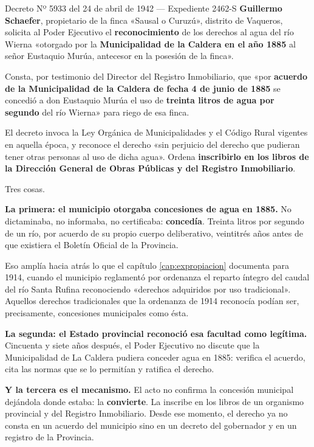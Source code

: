 \begin{ficha}{Decreto Nº 5933 del 24 de abril de 1942 --- Expediente 2462-S}
\textbf{Guillermo Schaefer}, propietario de la finca «Sausal o Curuzú», distrito de Vaqueros,
solicita al Poder Ejecutivo el \textbf{reconocimiento} de los derechos al agua del río
Wierna «otorgado por la \textbf{Municipalidad de la Caldera en el año 1885} al señor Eustaquio
Murúa, antecesor en la posesión de la finca».

Consta, por testimonio del Director del Registro Inmobiliario, que «por \textbf{acuerdo de la
Municipalidad de la Caldera de fecha 4 de junio de 1885} se concedió a don Eustaquio Murúa
el uso de \textbf{treinta litros de agua por segundo} del río Wierna» para riego de esa finca.

El decreto invoca la Ley Orgánica de Municipalidades y el Código Rural vigentes en aquella
época, y reconoce el derecho «sin perjuicio del derecho que pudieran tener otras personas al
uso de dicha agua». Ordena \textbf{inscribirlo en los libros de la Dirección General de Obras
Públicas y del Registro Inmobiliario}.
\end{ficha}

Tres cosas.

\textbf{La primera: el municipio otorgaba concesiones de agua en 1885.} No dictaminaba, no
informaba, no certificaba: \textbf{concedía}. Treinta litros por segundo de un río, por
acuerdo de su propio cuerpo deliberativo, veintitrés años antes de que existiera el Boletín
Oficial de la Provincia.

Eso amplía hacia atrás lo que el capítulo \ref{cap:expropiacion} documenta para 1914, cuando el municipio
reglamentó por ordenanza el reparto íntegro del caudal del río Santa Rufina reconociendo
«derechos adquiridos por uso tradicional». Aquellos derechos tradicionales que la ordenanza de
1914 reconocía podían ser, precisamente, concesiones municipales como ésta.

\textbf{La segunda: el Estado provincial reconoció esa facultad como legítima.} Cincuenta y
siete años después, el Poder Ejecutivo no discute que la Municipalidad de La Caldera pudiera
conceder agua en 1885: verifica el acuerdo, cita las normas que se lo permitían y ratifica el
derecho.

\textbf{Y la tercera es el mecanismo.} El acto no confirma la concesión municipal dejándola
donde estaba: la \textbf{convierte}. La inscribe en los libros de un organismo provincial y
del Registro Inmobiliario. Desde ese momento, el derecho ya no consta en un acuerdo del
municipio sino en un decreto del gobernador y en un registro de la Provincia.


